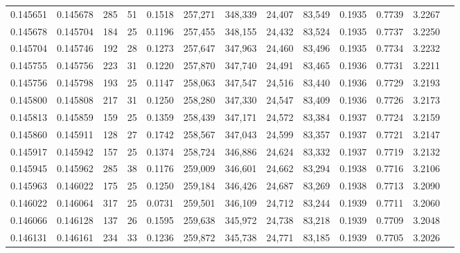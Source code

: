 \begin{tabular}{rrrrrrrrrrrrr}
0.145651 & 0.145678 &   285 &  51 &                                     0.1518 & 257,271 & 348,339 &  24,407 &  83,549 & 0.1935 & 0.7739 & 3.2267 \\
0.145678 & 0.145704 &   184 &  25 &                                     0.1196 & 257,455 & 348,155 &  24,432 &  83,524 & 0.1935 & 0.7737 & 3.2250 \\
0.145704 & 0.145746 &   192 &  28 &                                     0.1273 & 257,647 & 347,963 &  24,460 &  83,496 & 0.1935 & 0.7734 & 3.2232 \\
0.145755 & 0.145756 &   223 &  31 &                                     0.1220 & 257,870 & 347,740 &  24,491 &  83,465 & 0.1936 & 0.7731 & 3.2211 \\
0.145756 & 0.145798 &   193 &  25 &                                     0.1147 & 258,063 & 347,547 &  24,516 &  83,440 & 0.1936 & 0.7729 & 3.2193 \\
0.145800 & 0.145808 &   217 &  31 &                                     0.1250 & 258,280 & 347,330 &  24,547 &  83,409 & 0.1936 & 0.7726 & 3.2173 \\
0.145813 & 0.145859 &   159 &  25 &                                     0.1359 & 258,439 & 347,171 &  24,572 &  83,384 & 0.1937 & 0.7724 & 3.2159 \\
0.145860 & 0.145911 &   128 &  27 &                                     0.1742 & 258,567 & 347,043 &  24,599 &  83,357 & 0.1937 & 0.7721 & 3.2147 \\
0.145917 & 0.145942 &   157 &  25 &                                     0.1374 & 258,724 & 346,886 &  24,624 &  83,332 & 0.1937 & 0.7719 & 3.2132 \\
0.145945 & 0.145962 &   285 &  38 &                                     0.1176 & 259,009 & 346,601 &  24,662 &  83,294 & 0.1938 & 0.7716 & 3.2106 \\
0.145963 & 0.146022 &   175 &  25 &                                     0.1250 & 259,184 & 346,426 &  24,687 &  83,269 & 0.1938 & 0.7713 & 3.2090 \\
0.146022 & 0.146064 &   317 &  25 &                                     0.0731 & 259,501 & 346,109 &  24,712 &  83,244 & 0.1939 & 0.7711 & 3.2060 \\
0.146066 & 0.146128 &   137 &  26 &                                     0.1595 & 259,638 & 345,972 &  24,738 &  83,218 & 0.1939 & 0.7709 & 3.2048 \\
0.146131 & 0.146161 &   234 &  33 &                                     0.1236 & 259,872 & 345,738 &  24,771 &  83,185 & 0.1939 & 0.7705 & 3.2026 \\

\end{tabular}
